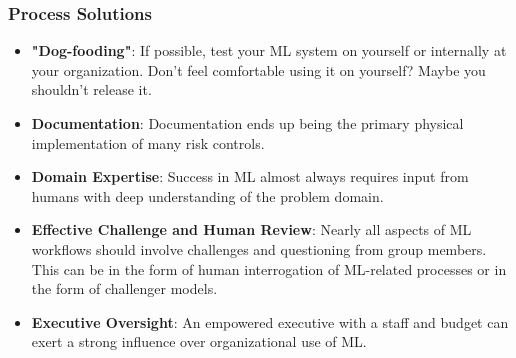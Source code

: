 \documentclass[11pt,
               aspectratio=169,
               hyperref={colorlinks}
               ]{beamer}
\begin{document}
		\begin{frame}
		
			\frametitle{Process Solutions}
			
			\begin{itemize}
				
				\item \textbf{"Dog-fooding"}: If possible, test your ML system on yourself or internally at your organization. Don't feel comfortable using it on yourself? Maybe you shouldn't release it. 

				\item \textbf{Documentation}: Documentation ends up being the primary physical implementation of many risk controls. 

				\item \textbf{Domain Expertise}: Success in ML almost always requires input from humans with deep understanding of the problem domain. 
				
				\item \textbf{Effective Challenge and Human Review}: Nearly all aspects of ML workflows should involve challenges and questioning from group members. This can be in the form of human interrogation of ML-related processes or in the form of challenger models. 
				
				\item \textbf{Executive Oversight}: An empowered executive with a staff and budget can exert a strong influence over organizational use of ML.
				
			\end{itemize}
			
		\end{frame}
		
\end{document}
